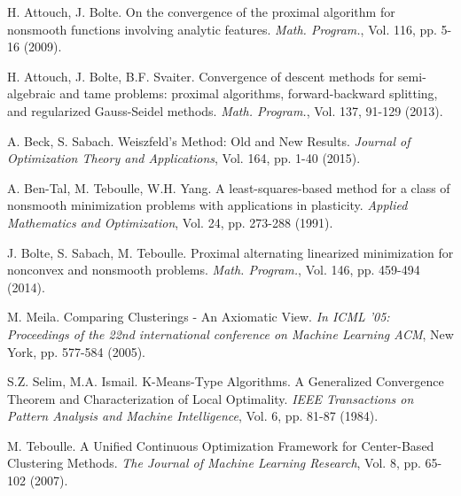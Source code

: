 \documentclass[12pt,a4paper]{report}
\begin{document}
\begin{thebibliography}{99}



%
%
%


 H. Attouch, J. Bolte. On the convergence of the proximal algorithm for nonsmooth functions involving analytic features. \emph{Math. Program.}, Vol. 116, pp. 5-16 (2009).


  H. Attouch, J. Bolte, B.F. Svaiter. Convergence of descent methods for semi-algebraic and tame problems: proximal algorithms, forward-backward splitting, and regularized Gauss-Seidel methods. \emph{Math. Program.}, Vol. 137, 91-129 (2013).


 A. Beck, S. Sabach. Weiszfeld's Method: Old and New Results. \emph{Journal of Optimization Theory and Applications}, Vol. 164, pp. 1-40 (2015).


 A. Ben-Tal, M. Teboulle, W.H. Yang. A least-squares-based method for a class of nonsmooth minimization problems with applications in plasticity.  \emph{Applied Mathematics and Optimization}, Vol. 24, pp. 273-288 (1991).


 J. Bolte, S. Sabach, M. Teboulle. Proximal alternating linearized minimization for nonconvex and nonsmooth problems. \emph{Math. Program.}, Vol. 146, pp. 459-494 (2014).


 M. Meila. Comparing Clusterings - An Axiomatic View. \emph{In ICML '05: Proceedings of the 22nd international conference on Machine Learning ACM}, New York, pp. 577-584 (2005).


 S.Z. Selim,  M.A. Ismail. K-Means-Type Algorithms. A Generalized Convergence Theorem and Characterization of Local Optimality. \emph{IEEE Transactions on Pattern Analysis and Machine Intelligence}, Vol. 6, pp. 81-87 (1984).


 M. Teboulle. A Unified Continuous Optimization Framework for Center-Based Clustering Methods. \emph{The Journal of Machine Learning Research}, Vol. 8, pp. 65-102 (2007).

\end{thebibliography}
\end{document}
